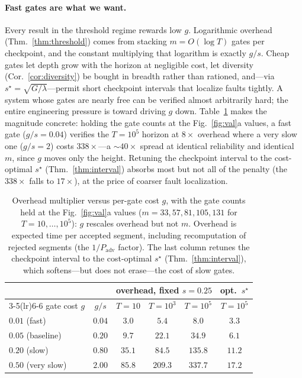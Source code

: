 \documentclass[11pt]{article}
\theoremstyle{remark}
\newcommand{\Padv}{P_{\mathrm{adv}}}
\begin{document}
\paragraph{Fast gates are what we want.} Every result in the threshold regime rewards low $g$.
Logarithmic overhead (Thm.~\ref{thm:threshold}) comes from stacking $m=O(\log T)$ gates per
checkpoint, and the constant multiplying that logarithm is exactly $g/s$.
Cheap gates let depth
grow with the horizon at negligible cost, let diversity (Cor.~\ref{cor:diversity}) be bought in
breadth rather than rationed, and---via $s^\star=\sqrt{G/\lambda}$---permit short checkpoint
intervals that localize faults tightly.
A system whose gates are nearly free can be verified
almost arbitrarily hard; the entire engineering pressure is toward driving $g$ down.
Table~\ref{tab:gatecost} makes the magnitude concrete: holding the gate counts at the
Fig.~\ref{fig:val}a values, a fast gate ($g/s=0.04$) verifies the $T=10^5$ horizon at $8\times$
overhead where a very slow one ($g/s=2$) costs $338\times$---a $\sim\!40\times$ spread at identical
reliability and identical $m$, since $g$ moves only the height.
Retuning the checkpoint interval to
the cost-optimal $s^\star$ (Thm.~\ref{thm:interval}) absorbs most but not all of the penalty (the
$338\times$ falls to $17\times$), at the price of coarser fault localization.

\begin{table}[t]
\centering
\small
\begin{tabular}{lccccc}
\toprule
 & & \multicolumn{3}{c}{overhead, fixed $s=0.25$} & opt.\ $s^\star$ \\
\cmidrule(lr){3-5}\cmidrule(lr){6-6}
gate cost $g$ & $g/s$ & $T{=}10$ & $T{=}10^3$ & $T{=}10^5$ & $T{=}10^5$ \\
\midrule
$0.01$ (fast)      & $0.04$ & $3.0$  & $5.4$   & $8.0$   & $3.3$  \\
$0.05$ (baseline)  & $0.20$ & $9.7$  & $22.1$  & $34.9$  & $6.1$  \\
$0.20$ (slow)      & $0.80$ & $35.1$ & $84.5$  & $135.8$ & $11.2$ \\
$0.50$ (very slow) & $2.00$ & $85.8$ & $209.3$ & $337.7$ & $17.2$ \\
\bottomrule
\end{tabular}
\caption{Overhead multiplier versus per-gate cost $g$, with the gate counts held at the
Fig.~\ref{fig:val}a values ($m=33,57,81,105,131$ for $T=10,\dots,10^5$): $g$ rescales overhead but
not $m$. Overhead is expected time per accepted segment, including recomputation of rejected
segments (the $1/\Padv$ factor). The last column retunes the checkpoint interval to the
cost-optimal $s^\star$ (Thm.~\ref{thm:interval}), which softens---but does not erase---the cost of
slow gates.}
\label{tab:gatecost}
\end{table}
\end{document}

